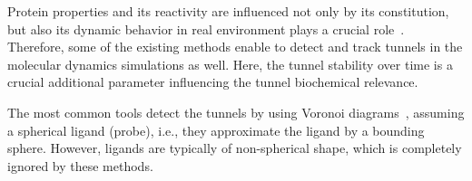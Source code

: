\documentclass{bmcart}
\begin{document}
Protein properties and its reactivity are influenced not only by its constitution, but also its dynamic behavior in real environment plays a crucial role~\cite{zhou2010gates,dynasome}.
Therefore, some of the existing methods enable to detect and track tunnels in the molecular dynamics simulations as well. 
Here, the tunnel stability over time is a crucial additional parameter influencing the tunnel biochemical relevance. 


The most common tools detect the tunnels by using Voronoi diagrams~\cite{yaffe2008,caver3}, assuming a spherical ligand (probe), 
i.e., they approximate the ligand by a bounding sphere.
However, ligands are typically of non-spherical shape, which is completely ignored by these methods. 
\end{document}
